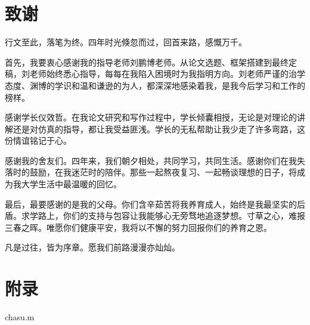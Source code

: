 



\chapter*{\sanhao\heiti\textbf{致\qquad 谢}}

行文至此，落笔为终。四年时光倏忽而过，回首来路，感慨万千。

首先，我要衷心感谢我的指导老师刘鹏博老师。从论文选题、框架搭建到最终定稿，刘老师始终悉心指导，每每在我陷入困境时为我指明方向。刘老师严谨的治学态度、渊博的学识和温和谦逊的为人，都深深地感染着我，是我今后学习和工作的榜样。

感谢学长仪效哲。在我论文研究和写作过程中，学长倾囊相授，无论是对理论的讲解还是对仿真的指导，都让我受益匪浅。学长的无私帮助让我少走了许多弯路，这份情谊铭记于心。

感谢我的舍友们。四年来，我们朝夕相处，共同学习，共同生活。感谢你们在我失落时的鼓励，在我迷茫时的陪伴。那些一起熬夜复习、一起畅谈理想的日子，将成为我大学生活中最温暖的回忆。

最后，最要感谢的是我的父母。你们含辛茹苦将我养育成人，始终是我最坚实的后盾。求学路上，你们的支持与包容让我能够心无旁骛地追逐梦想。寸草之心，难报三春之晖。唯愿你们健康平安，我将以不懈的努力回报你们的养育之恩。

凡是过往，皆为序章。愿我们前路漫漫亦灿灿。




\chapter*{\sanhao\heiti\textbf{附\qquad 录}}

chasu.m




